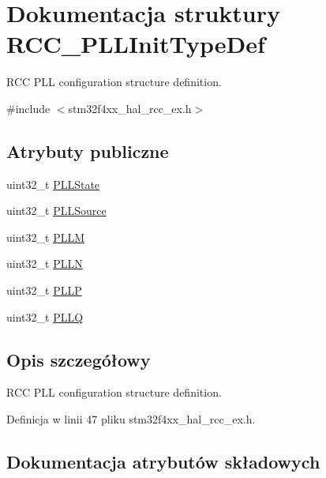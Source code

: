 \hypertarget{struct_r_c_c___p_l_l_init_type_def}{}\section{Dokumentacja struktury R\+C\+C\+\_\+\+P\+L\+L\+Init\+Type\+Def}
\label{struct_r_c_c___p_l_l_init_type_def}


R\+CC P\+LL configuration structure definition.  




{\ttfamily \#include $<$stm32f4xx\+\_\+hal\+\_\+rcc\+\_\+ex.\+h$>$}

\subsection*{Atrybuty publiczne}
\begin{DoxyCompactItemize}
\item 
uint32\+\_\+t \hyperlink{struct_r_c_c___p_l_l_init_type_def_a6cbaf84f6566af15e6e4f97a339d5759}{P\+L\+L\+State}
\item 
uint32\+\_\+t \hyperlink{struct_r_c_c___p_l_l_init_type_def_a72806832a179af8756b9330de7f7c6a8}{P\+L\+L\+Source}
\item 
uint32\+\_\+t \hyperlink{struct_r_c_c___p_l_l_init_type_def_af8ae37696b35fd358c1ec1f6391158a4}{P\+L\+LM}
\item 
uint32\+\_\+t \hyperlink{struct_r_c_c___p_l_l_init_type_def_a2482608639ebfffc51a41135c979369b}{P\+L\+LN}
\item 
uint32\+\_\+t \hyperlink{struct_r_c_c___p_l_l_init_type_def_a4ecedf3ef401fa564aa636824fc3ded0}{P\+L\+LP}
\item 
uint32\+\_\+t \hyperlink{struct_r_c_c___p_l_l_init_type_def_a2b69dfec4b8ab52d649a71d141892691}{P\+L\+LQ}
\end{DoxyCompactItemize}


\subsection{Opis szczegółowy}
R\+CC P\+LL configuration structure definition. 

Definicja w linii 47 pliku stm32f4xx\+\_\+hal\+\_\+rcc\+\_\+ex.\+h.



\subsection{Dokumentacja atrybutów składowych}
\mbox{\label{struct_r_c_c___p_l_l_init_type_def_af8ae37696b35fd358c1ec1f6391158a4}} 
